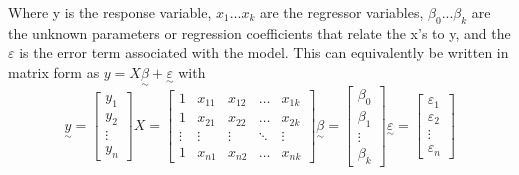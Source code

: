 \documentclass[12pt]{report}
\begin{document}
Where y is the response variable, $x_{1} ... x_{k}$ are the regressor variables, $\beta_{0} ... \beta_{k}$ are the unknown parameters or regression coefficients that relate the x's to y, and the $\varepsilon$ is the error term associated with the model. This can equivalently be written in matrix form as $y = {X}\underset{\sim}\beta + \underset{\sim}\varepsilon$ with 
\begin{equation*}
\underset{\sim}y = 
    \begin{bmatrix}
    y_{1} \\
    y_{2} \\
    \vdots \\
    y_{n}
    \end{bmatrix}
X = 
    \begin{bmatrix}
    1 & x_{11} & x_{12} & \dots & x_{1k}\\
    1 & x_{21} & x_{22} & \dots & x_{2k}\\
    \vdots & \vdots & \vdots & \ddots & \vdots \\
    1 & x_{n1} & x_{n2} & \dots & x_{nk}
    \end{bmatrix}
\underset{\sim}\beta = 
    \begin{bmatrix}
    \beta_{0} \\
    \beta_{1} \\
    \vdots \\
    \beta_{k}
    \end{bmatrix}
\underset{\sim}\varepsilon = 
    \begin{bmatrix}
    \varepsilon_{1} \\
    \varepsilon_{2} \\
    \vdots \\
    \varepsilon_{n}
    \end{bmatrix}
\end{equation*}
\end{document}
